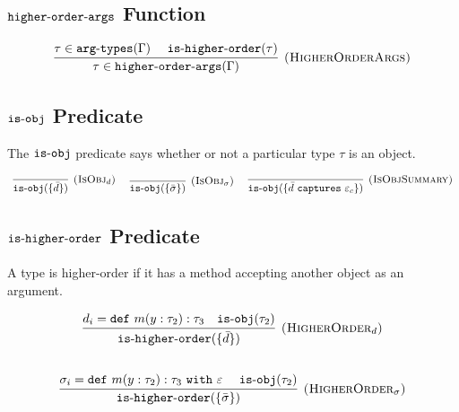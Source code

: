 \documentclass{llncs}
\newcommand{\keywadj}[1]{\mathtt{#1}}
\newcommand{\keyw}[1]{\keywadj{#1}~}
\newcommand{\kw}[1]{\keyw{ #1 }}
\newcommand{\kwa}[1]{\keywadj{ #1 }}
\newcommand{\hyphen}{\hbox{-}}
\begin{document}
\subsection{$\keywadj{higher \hyphen order \hyphen args}$ Function}

\[
\begin{array}{c}

\infer[\textsc{(HigherOrderArgs)}]
	{\tau \in \kwa{higher \hyphen order \hyphen args}(\Gamma)}
	{\tau \in \kwa{arg \hyphen types}(\Gamma) ~~~~ \kwa{is \hyphen higher \hyphen order}(\tau)}

\end{array}
\]

\subsection{$\keywadj{is \hyphen obj}$ Predicate}

\noindent
The $\kwa{is \hyphen obj}$ predicate says whether or not a particular type $\tau$ is an object.

\[
\begin{array}{c}

\infer[\textsc{(IsObj$_d$)}]
	{\kwa{is \hyphen obj}(\{ \bar d \})}
	{}
	
	~~~~
	
	\infer[\textsc{(IsObj$_\sigma$)}]
	{\kwa{is \hyphen obj}(\{ \bar \sigma \})}
	{}
	
	~~~~
	
	\infer[\textsc{(IsObjSummary)}]
	{\kwa{is \hyphen obj}(\{ \bar d~\kw{captures} \varepsilon_c\})}
	{}

\end{array}
\]

\subsection{$\kwa{is \hyphen higher \hyphen order}$ Predicate}

A type is higher-order if it has a method accepting another object as an argument.


\[
\begin{array}{c}

\infer[\textsc{(HigherOrder$_d$)}]
	{\kwa{is \hyphen higher \hyphen order}(\{ \bar d \})}
	{d_i = \kwa{def}~m(y: \tau_2): \tau_3 ~~~\kwa{is \hyphen obj}(\tau_2)}
	\\[5ex]
	\infer[\textsc{(HigherOrder$_\sigma$)}]
	{\kwa{is \hyphen higher \hyphen order}(\{ \bar \sigma \})}
	{\sigma_i = \kwa{def}~m(y: \tau_2): \tau_3 ~\kw{with} \varepsilon ~~~~ \kwa{is \hyphen obj}(\tau_2)}

\end{array}
\]
\end{document}
